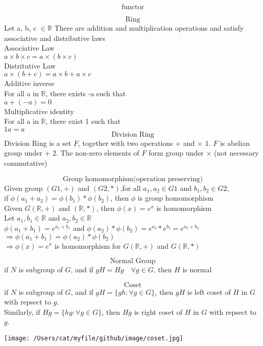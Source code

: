 \documentclass[10pt]{article}
\begin{document}
\[ \text{functor} \]

\[ \text{ Ring } \]
Let a, b, c $\in  \mathbb{R}$ There are addition and multiplication operations and satisfy associative and distributive laws\\

Associative Law\\
$ a \times b \times c = a \times (b \times c) $\\

Distritutive Law\\
$a \times (b + c) = a \times b + a \times c $\\

Additive inverse\\
For all a in $\mathbb{R}$, there exists -a such that\\
$a + (-a) = 0$\\

Multiplicative identity \\
For all a in $\mathbb{R}$, there exist 1 such that\\
$1a = a$ \\

\[ \text{Division Ring} \] 
Division Ring is a set $F$, together with two operations + and $\times$ 
1. $F$ is abelian group under +
2. The non-zero elements of $F$ form group under $\times$ (not necessary commutative)

\[\text{Group homomorphism(operation preserving)}\]
Given group $(G1, +)$ and $(G2, *)$,for all $a_1, a_2 \in G1$ and $b_1, b_2 \in G2$,\\
if $\phi(a_1 + a_2) = \phi(b_1)*\phi(b_2)$, then $\phi$ is group homomorphism\\

Given $G(\mathbb{R}, +)$ and $(\mathbb{R}, *)$, then $\phi(x) = e^x$ is homomorphism\\ 
Let $a_1, b_1 \in \mathbb{R}$ and $a_2, b_2 \in \mathbb{R}$\\ 
$\phi(a_1+b_1) = e^{a_1 + b_1}$ and $\phi(a_2)*\phi(b_2) = e^{a_2}*e^{b_2} = e^{a_2+b_2}$\\
$\Rightarrow \phi(a_1 + b_1) = \phi(a_2)*\phi(b_2)$\\
$\Rightarrow \phi(x) = e^{x}$ is homomorphism for $G(\mathbb{R}, +)$ and $G(\mathbb{R}, *)$

\[\text{Normal Group} \]
if $N$ is subgroup of $G$, and if $gH = Hg \quad \forall g \in G$, then $H$ is normal

\[ \text{Coset} \]
if $N$ is subgroup of $G$, and if $gH = \{gh: \forall g \in G \}$, then $gH$ is left coset of $H$ in $G$ with repsect to $g$.\\
Similarly, if $Hg = \{hg: \forall g \in G \}$, then $Hg$ is right coset of $H$ in $G$ with repsect to $g$.\\
\begin{center}
\texttt{[image: /Users/cat/myfile/github/image/coset.jpg]}\\
\end{center}
\end{document}
